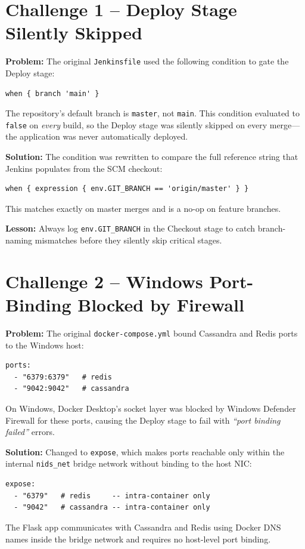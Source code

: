 \documentclass[12pt,a4paper]{report}
\begin{document}
\section{Challenge 1 -- Deploy Stage Silently Skipped}

\textbf{Problem:}  The original \texttt{Jenkinsfile} used the following
condition to gate the Deploy stage:
\begin{lstlisting}[style=groovystyle]
when { branch 'main' }
\end{lstlisting}
The repository's default branch is \texttt{master}, not \texttt{main}.
This condition evaluated to \texttt{false} on \textit{every} build, so the
Deploy stage was silently skipped on every merge---the application was never
automatically deployed.

\textbf{Solution:}  The condition was rewritten to compare the full reference
string that Jenkins populates from the SCM checkout:
\begin{lstlisting}[style=groovystyle]
when { expression { env.GIT_BRANCH == 'origin/master' } }
\end{lstlisting}
This matches exactly on master merges and is a no-op on feature branches.

\textbf{Lesson:}  Always log \texttt{env.GIT\_BRANCH} in the Checkout stage
to catch branch-naming mismatches before they silently skip critical stages.

\section{Challenge 2 -- Windows Port-Binding Blocked by Firewall}

\textbf{Problem:}  The original \texttt{docker-compose.yml} bound Cassandra
and Redis ports to the Windows host:
\begin{lstlisting}[style=bashstyle]
ports:
  - "6379:6379"   # redis
  - "9042:9042"   # cassandra
\end{lstlisting}
On Windows, Docker Desktop's socket layer was blocked by Windows Defender
Firewall for these ports, causing the Deploy stage to fail with
\textit{``port binding failed''} errors.

\textbf{Solution:}  Changed to \texttt{expose}, which makes ports reachable
only within the internal \texttt{nids\_net} bridge network without binding to
the host NIC:
\begin{lstlisting}[style=bashstyle]
expose:
  - "6379"   # redis     -- intra-container only
  - "9042"   # cassandra -- intra-container only
\end{lstlisting}
The Flask app communicates with Cassandra and Redis using Docker DNS names
inside the bridge network and requires no host-level port binding.
\end{document}
